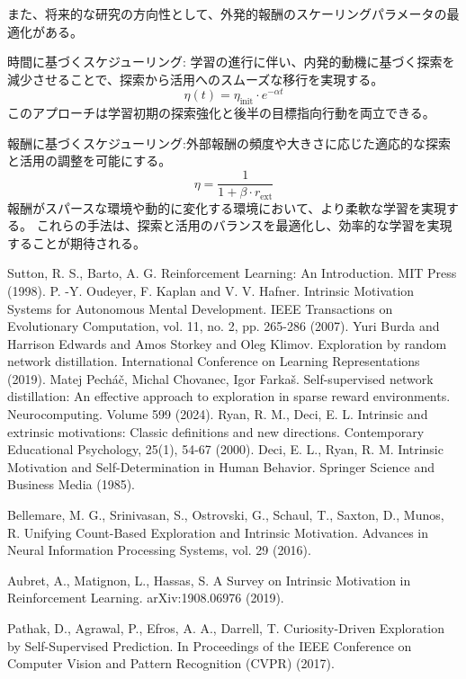 また、将来的な研究の方向性として、外発的報酬のスケーリングパラメータの最適化がある。

時間に基づくスケジューリング: 学習の進行に伴い、内発的動機に基づく探索を減少させることで、探索から活用へのスムーズな移行を実現する。
\[
   \eta(t) = \eta_{\text{init}} \cdot e^{-\alpha t}
\]
このアプローチは学習初期の探索強化と後半の目標指向行動を両立できる。

報酬に基づくスケジューリング:外部報酬の頻度や大きさに応じた適応的な探索と活用の調整を可能にする。
\[
\eta = \frac{1}{1 + \beta \cdot r_{\text{ext}}}
\]
報酬がスパースな環境や動的に変化する環境において、より柔軟な学習を実現する。
これらの手法は、探索と活用のバランスを最適化し、効率的な学習を実現することが期待される。

\begin{thebibliography}{99}
   Sutton, R. S., Barto, A. G.
   Reinforcement Learning: An Introduction.
   MIT Press (1998).
   P. -Y. Oudeyer, F. Kaplan and V. V. Hafner.
   Intrinsic Motivation Systems for Autonomous Mental Development.
   IEEE Transactions on Evolutionary Computation, vol. 11, no. 2, pp. 265-286 (2007).
   Yuri Burda and Harrison Edwards and Amos Storkey and Oleg Klimov.
   Exploration by random network distillation.
   International Conference on Learning Representations (2019).
   Matej Pecháč, Michal Chovanec, Igor Farkaš.
   Self-supervised network distillation: An effective approach to exploration in sparse reward environments.
   Neurocomputing.
   Volume 599 (2024).
   Ryan, R. M., Deci, E. L.
   Intrinsic and extrinsic motivations: Classic definitions and new directions.
   Contemporary Educational Psychology, 25(1), 54-67 (2000).
   Deci, E. L., Ryan, R. M.
   Intrinsic Motivation and Self-Determination in Human Behavior.
   Springer Science and Business Media (1985).

   Bellemare, M. G., Srinivasan, S., Ostrovski, G., Schaul, T., Saxton, D., Munos, R.
   Unifying Count-Based Exploration and Intrinsic Motivation.
   Advances in Neural Information Processing Systems, vol. 29 (2016).

   Aubret, A., Matignon, L., Hassas, S.
   A Survey on Intrinsic Motivation in Reinforcement Learning.
   arXiv:1908.06976 (2019).

   Pathak, D., Agrawal, P., Efros, A. A., Darrell, T.
   Curiosity-Driven Exploration by Self-Supervised Prediction.
   In Proceedings of the IEEE Conference on Computer Vision and Pattern Recognition (CVPR) (2017).


\end{thebibliography}
